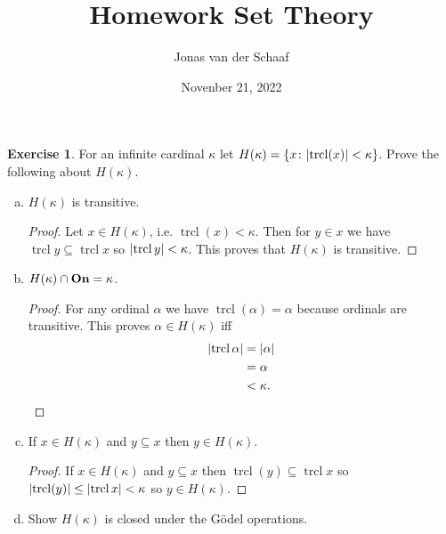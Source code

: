 \documentclass{article}
\title{Homework Set Theory}
\date{Novenber 21, 2022}
\author{Jonas van der Schaaf}
\theoremstyle{definition}
\newtheorem{question}{Exercise}
\newcommand{\set}[1]{\left\{#1\right\}}
\newcommand{\setwith}[2]{\set{#1\colon#2}}
\DeclareMathOperator{\trcl}{trcl}
\newcommand{\ordinals}{{\bf On}}
\DeclarePairedDelimiter{\abs}{|}{|}
\begin{document}
\maketitle

\begin{question}
    For an infinite cardinal \(\kappa\) let
    \(H(\kappa)=\setwith{x}{\abs{\trcl(x)}<\kappa}\). Prove the following about
    \(H(\kappa)\).

    \begin{enumerate}[a.]
        \item \(H(\kappa)\) is transitive.

              \begin{proof}
                  Let \(x\in H(\kappa)\), i.e. \(\trcl(x)<\kappa\). Then for
                  \(y\in x\) we have \(\trcl{y}\subseteq\trcl{x}\) so
                  \(\abs{\trcl{y}}<\kappa\). This proves that \(H(\kappa)\) is
                  transitive.
              \end{proof}

        \item \(H(\kappa)\cap \ordinals=\kappa\).

              \begin{proof}
                  For any ordinal \(\alpha\) we have \(\trcl(\alpha)=\alpha\)
                  because ordinals are transitive. This proves \(\alpha\in
                  H(\kappa)\) iff
                  \begin{align*}
                      \abs{\trcl{\alpha}} & =\abs{\alpha} \\
                                          & =\alpha       \\
                                          & <\kappa.
                  \end{align*}
              \end{proof}

        \item If \(x\in H(\kappa)\) and \(y\subseteq x\) then \(y\in
              H(\kappa)\).

              \begin{proof}
                  If \(x\in H(\kappa)\) and \(y\subseteq x\) then
                  \(\trcl(y)\subseteq\trcl{x}\) so
                  \(\abs{\trcl(y)}\leq\abs{\trcl{x}}<\kappa\) so \(y\in
                  H(\kappa)\).
              \end{proof}

        \item Show \(H(\kappa)\) is closed under the Gödel operations.


\end{enumerate}
\end{question}
\end{document}
